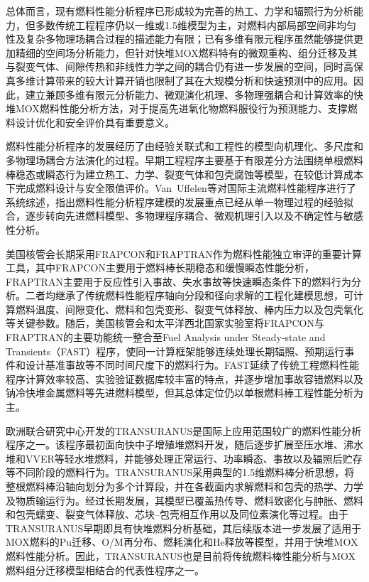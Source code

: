 总体而言，现有燃料性能分析程序已形成较为完善的热工、力学和辐照行为分析能力，但多数传统工程程序仍以一维或1.5维模型为主，对燃料内部局部空间非均匀性及复杂多物理场耦合过程的描述能力有限；已有多维有限元程序虽然能够提供更加精细的空间场分析能力，但针对快堆MOX燃料特有的微观重构、组分迁移及其与裂变气体、间隙传热和非线性力学之间的耦合仍有进一步发展的空间，同时高保真多维计算带来的较大计算开销也限制了其在大规模分析和快速预测中的应用。因此，建立兼顾多维有限元分析能力、微观演化机理、多物理强耦合和计算效率的快堆MOX燃料性能分析方法，对于提高先进氧化物燃料服役行为预测能力、支撑燃料设计优化和安全评价具有重要意义。



燃料性能分析程序的发展经历了由经验关联式和工程性的模型向机理化、多尺度和多物理场耦合方法演化的过程。早期工程程序主要基于有限差分方法围绕单根燃料棒稳态或瞬态行为建立热工、力学、裂变气体和包壳腐蚀等模型，在较低计算成本下完成燃料设计与安全限值评价。Van~Uffelen等\cite{vanuffelenReviewFuelPerformance2019}对国际主流燃料性能程序进行了系统综述，指出燃料性能分析程序建模的发展重点已经从单一物理过程的经验拟合，逐步转向先进燃料模型、多物理程序耦合、微观机理引入以及不确定性与敏感性分析。

美国核管会长期采用FRAPCON和FRAPTRAN作为燃料性能独立审评的重要计算工具，其中FRAPCON主要用于燃料棒长期稳态和缓慢瞬态性能分析，FRAPTRAN主要用于反应性引入事故、失水事故等快速瞬态条件下的燃料行为分析。二者均继承了传统燃料性能程序轴向分段和径向求解的工程化建模思想，可计算燃料温度、间隙变化、燃料和包壳变形、裂变气体释放、棒内压力以及包壳氧化等关键参数。随后，美国核管会和太平洋西北国家实验室将FRAPCON与FRAPTRAN的主要功能统一整合至Fuel Analysis under Steady-state and Transients（FAST）程序，使同一计算框架能够连续处理长期辐照、预期运行事件和设计基准事故等不同时间尺度下的燃料行为\cite{porterFAST10Computer2020}。FAST延续了传统工程燃料性能程序计算效率较高、实验验证数据库较丰富的特点，并逐步增加事故容错燃料以及钠冷快堆金属燃料等先进燃料模型，但其总体定位仍以单根燃料棒工程性能分析为主。

欧洲联合研究中心开发的TRANSURANUS是国际上应用范围较广的燃料性能分析程序之一。该程序最初面向快中子增殖堆燃料开发，随后逐步扩展至压水堆、沸水堆和VVER等轻水堆燃料，并能够处理正常运行、功率瞬态、事故以及辐照后贮存等不同阶段的燃料行为\cite{lassmannTRANSURANUSFuelRod1992}。TRANSURANUS采用典型的1.5维燃料棒分析思想，将整根燃料棒沿轴向划分为多个计算段，并在各截面内求解燃料和包壳的热学、力学及物质输运行为。经过长期发展，其模型已覆盖热传导、燃料致密化与肿胀、燃料和包壳蠕变、裂变气体释放、芯块--包壳相互作用以及同位素演化等过程。由于TRANSURANUS早期即具有快堆燃料分析基础，其后续版本进一步发展了适用于MOX燃料的Pu迁移、O/M再分布、燃耗演化和He释放等模型，并用于快堆MOX燃料性能分析\cite{dimarcelloExtensionTRANSURANUSPlutonium2012,dimarcelloModellingActinideRedistribution2014}。因此，TRANSURANUS也是目前将传统燃料棒性能分析与MOX燃料组分迁移模型相结合的代表性程序之一。

